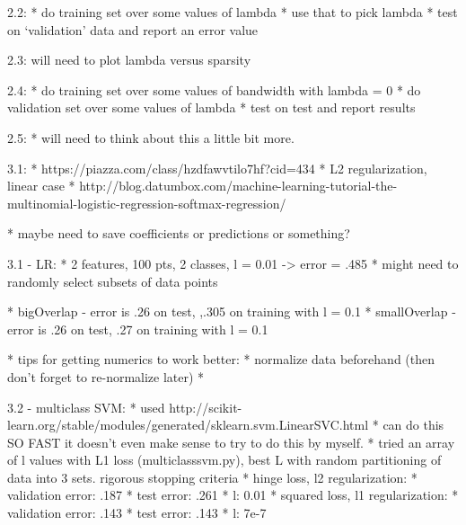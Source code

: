 \documentclass[10pt]{article}
\begin{document}
2.2: 
* do training set over some values of lambda
* use that to pick lambda
* test on `validation' data and report an error value

2.3:
will need to plot lambda versus sparsity

2.4:
* do training set over some values of bandwidth with lambda = 0
* do validation set over some values of lambda
* test on test and report results

2.5:
* will need to think about this a little bit more.

3.1:
* https://piazza.com/class/hzdfawvtilo7hf?cid=434
* L2 regularization, linear case
* http://blog.datumbox.com/machine-learning-tutorial-the-multinomial-logistic-regression-softmax-regression/

* maybe need to save coefficients or predictions or something?

3.1 - LR:
* 2 features, 100 pts, 2 classes, l = 0.01 -> error = .485
* might need to randomly select subsets of data points

* bigOverlap - error is .26 on test, ,.305 on training with l = 0.1
* smallOverlap - error is .26 on test, .27 on training with l = 0.1

* tips for getting numerics to work better:
	* normalize data beforehand (then don't forget to re-normalize later)
	* 

3.2 - multiclass SVM:
* used http://scikit-learn.org/stable/modules/generated/sklearn.svm.LinearSVC.html
* can do this SO FAST it doesn't even make sense to try to do this by myself.
* tried an array of l values with L1 loss (multiclasssvm.py), best L with random partitioning of data into 3 sets. rigorous stopping criteria
* hinge loss, l2 regularization: 
	* validation error: .187
	* test error: .261
	* l: 0.01
* squared loss, l1 regularization:
	* validation error: .143
	* test error: .143
	* l: 7e-7
\end{document}
